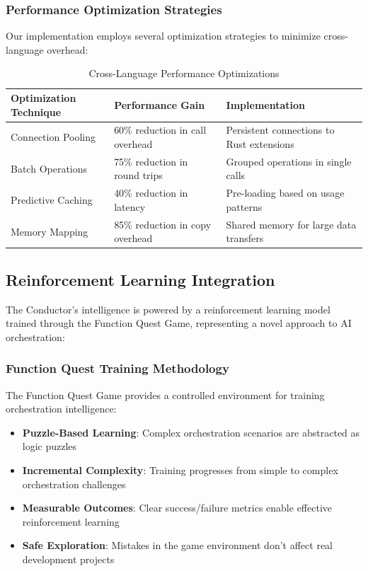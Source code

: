 \subsubsection{Performance Optimization Strategies}

Our implementation employs several optimization strategies to minimize cross-language overhead:

\begin{table}[ht]
\centering
\begin{tabular}{@{}lll@{}}
\toprule
\textbf{Optimization Technique} & \textbf{Performance Gain} & \textbf{Implementation} \\
\midrule
Connection Pooling & 60\% reduction in call overhead & Persistent connections to Rust extensions \\
Batch Operations & 75\% reduction in round trips & Grouped operations in single calls \\
Predictive Caching & 40\% reduction in latency & Pre-loading based on usage patterns \\
Memory Mapping & 85\% reduction in copy overhead & Shared memory for large data transfers \\
\bottomrule
\end{tabular}
\caption{Cross-Language Performance Optimizations}
\label{tab:cross-language-optimizations}
\end{table}

\subsection{Reinforcement Learning Integration}

The Conductor's intelligence is powered by a reinforcement learning model trained through the Function Quest Game, representing a novel approach to AI orchestration:

\subsubsection{Function Quest Training Methodology}

The Function Quest Game provides a controlled environment for training orchestration intelligence:

\begin{itemize}
    \item \textbf{Puzzle-Based Learning}: Complex orchestration scenarios are abstracted as logic puzzles
    \item \textbf{Incremental Complexity}: Training progresses from simple to complex orchestration challenges
    \item \textbf{Measurable Outcomes}: Clear success/failure metrics enable effective reinforcement learning
    \item \textbf{Safe Exploration}: Mistakes in the game environment don't affect real development projects
\end{itemize}

